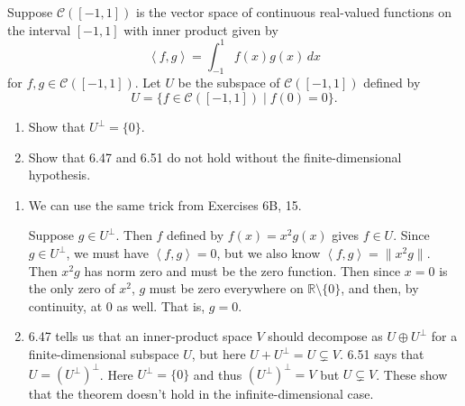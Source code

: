 \documentclass[12 pt, letterpaper]{hmcpset}
\begin{document}
\begin{problem}[14]
	Suppose $\mathcal{C}([-1, 1])$ is the vector space of continuous real-valued functions on the interval $[-1, 1]$ with inner product given by
	\[
		\left < f, g \right > = \int_{-1}^{1} f(x) g(x) \, dx 
	\]
	for $f, g \in \mathcal{C}([-1, 1])$. Let $U$ be the subspace of $\mathcal{C}([-1, 1])$ defined by
	 \[
		U = \{ f \in \mathcal{C}([-1, 1]) \mid f(0) = 0 \}.
	\]
	\begin{enumerate}
		\item Show that $U^{\perp} = \{ 0 \}$.
		\item Show that 6.47 and 6.51 do not hold without the finite-dimensional hypothesis.
	\end{enumerate}
\end{problem}

\begin{solution}
	\begin{enumerate}
		\item We can use the same trick from Exercises 6B, 15.

			Suppose $g \in U^{\perp}$. Then $f$ defined by $f(x) = x^{2} g(x)$ gives $f \in U$. Since $g \in U^{\perp}$, we must have $\left < f, g \right > = 0$, but we also know $\left < f, g \right > = \lVert x^{2} g \rVert$. Then $x^{2} g$ has norm zero and must be the zero function. Then since $x = 0$ is the only zero of $x^{2}$, $g$ must be zero everywhere on $\mathbb{R} \setminus \{ 0 \}$, and then, by continuity, at $0$ as well. That is, $g = 0$.
		\item 6.47 tells us that an inner-product space $V$ should decompose as $U \oplus U^{\perp}$ for a finite-dimensional subspace $U$, but here $U + U^{\perp} = U \subsetneq V$. 6.51 says that $U = (U^{\perp})^{\perp}$. Here $U^{\perp} = \{ 0 \}$ and thus  $(U^{\perp})^{\perp} = V$ but  $U \subsetneq V$. These show that the theorem doesn't hold in the infinite-dimensional case.
	\end{enumerate}
\end{solution}
\end{document}
